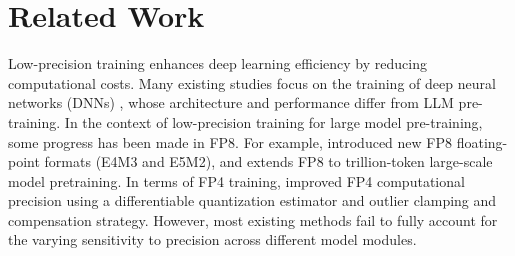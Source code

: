 \section{Related Work}
Low-precision training enhances deep learning efficiency by reducing computational costs. Many existing studies focus on the training of deep neural networks (DNNs) \cite{wang2018training,chmiel2023accurate, sun2019hybrid,xi2023training,fu2021cpt}, whose architecture and performance differ from LLM pre-training. %
In the context of low-precision training for large model pre-training, some progress has been made in FP8. For example, \cite{micikevicius2022fp8} introduced new FP8 floating-point formats (E4M3 and E5M2), %
and \cite{fishman2024scaling} extends FP8 to trillion-token large-scale model pretraining. In terms of FP4 training, \cite{wang2025optimizing} improved FP4 computational precision using a differentiable quantization estimator and outlier clamping and compensation strategy. However, most existing methods fail to fully account for the varying sensitivity to precision across different model modules.

